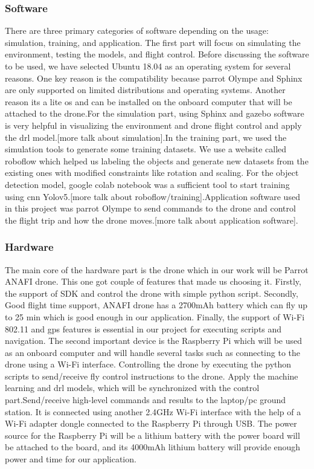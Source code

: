 \documentclass[../main.tex]{subfiles}
\begin{document}
\subsubsection{Software}
There are three primary categories of software depending on the usage: simulation, training, and application. The first part will focus on simulating the environment, testing the models, and flight control. Before discussing the software to be used, we have selected Ubuntu 18.04 as an operating system for several reasons. One key reason is the compatibility because parrot Olympe and Sphinx are only supported on limited distributions and operating systems. Another reason its a lite os and can be installed on the onboard computer that will be attached to the drone.For the simulation part, using Sphinx and gazebo software is very helpful in visualizing the environment and drone flight control and apply the \gls{drl} model.[more talk about simulation].In the training part, we used the simulation tools to generate some training datasets. We use a website called roboflow which helped us labeling the objects and generate new datasets from the existing ones with modified constraints like rotation and scaling. For the object detection model, google colab notebook was a sufficient tool to start training using \gls{cnn} Yolov5.[more talk about roboflow/training].Application software used in this project was parrot Olympe to send commands to the drone and control the flight trip and how the drone moves.[more talk about application software].


\subsubsection{Hardware}
The main core of the hardware part is the drone which in our work will be Parrot ANAFI drone. This one got couple of features that made us choosing it. Firstly, the support of SDK and control the drone with simple python script. Secondly, Good flight time support, ANAFI drone has a 2700mAh battery which can fly up to 25 min which is good enough in our application. Finally, the support of Wi-Fi 802.11 and \gls{gps} features is essential in our project for executing scripts and navigation. The second important device is the Raspberry Pi which will be used as an onboard computer and will handle several tasks such as connecting to the drone using a Wi-Fi interface. Controlling the drone by executing the python scripts to send/receive fly control instructions to the drone. Apply the machine learning and \gls{drl} models, which will be synchronized with the control part.Send/receive high-level commands and results to the laptop/pc ground station. It is connected using another 2.4GHz Wi-Fi interface with the help of a Wi-Fi adapter dongle connected to the Raspberry Pi through USB. The power source for the Raspberry Pi will be a lithium battery with the power board will be attached to the board, and its 4000mAh lithium battery will provide enough power and time for our application.      
\end{document}
